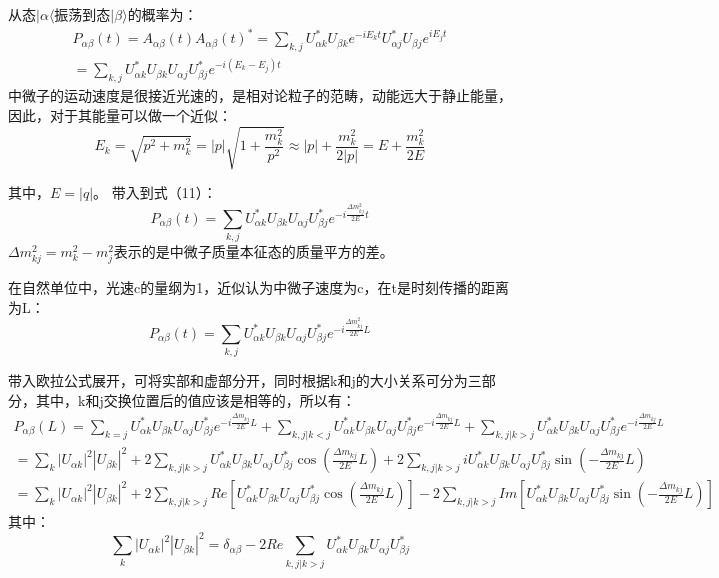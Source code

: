 \documentclass[10pt,a4paper]{article}
\begin{document}
从态$|\alpha\langle$振荡到态$|\beta\rangle$的概率为：
\begin{equation}
\begin{split}
P_{\alpha\beta}(t)=A_{\alpha\beta}(t){A_{\alpha\beta}(t)}^*=\sum_{k,j}U_{\alpha k}^{*}U_{\beta k}e^{-iE_{k}t}U_{\alpha j}^{*}U_{\beta j}e^{iE_{j}t}\\
=\sum_{k,j}U_{\alpha k}^{*}U_{\beta k}U_{\alpha j}U_{\beta j}^{*}e^{-i(E_{k}-E_{j})t}
\end{split}
\end{equation}
中微子的运动速度是很接近光速的，是相对论粒子的范畴，动能远大于静止能量，因此，对于其能量可以做一个近似：
\begin{equation}
E_{k}=\sqrt{p^2+m_k^2}=|p|\sqrt{1+\frac{m_k^2}{p^2}}\approx |p|+\frac{m_k^2}{2|p|}=E+\frac{m_k^2}{2E}
\end{equation}

其中，$E=|q|$。
带入到式（11）：
\begin{equation}
P_{\alpha\beta}(t)=\sum_{k,j}U_{\alpha k}^{*}U_{\beta k}U_{\alpha j}U_{\beta j}^{*}e^{-i\frac{\Delta m_{kj}^2}{2E}t}
\end{equation}
$\Delta m_{kj}^2=m_k^2-m_j^2$表示的是中微子质量本征态的质量平方的差。

在自然单位中，光速c的量纲为1，近似认为中微子速度为c，在t是时刻传播的距离为L：
\begin{equation}
P_{\alpha\beta}(t)=\sum_{k,j}U_{\alpha k}^{*}U_{\beta k}U_{\alpha j}U_{\beta j}^{*}e^{-i\frac{\Delta m_{kj}^2}{2E}L}
\end{equation}

带入欧拉公式展开，可将实部和虚部分开，同时根据k和j的大小关系可分为三部分，其中，k和j交换位置后的值应该是相等的，所以有：
\begin{equation}
\begin{split}
P_{\alpha\beta}(L)=\sum_{k=j}U_{\alpha k}^{*}U_{\beta k}U_{\alpha j}U_{\beta j}^{*}e^{-i\frac{\Delta m_{kj}}{2E}L}+\sum_{k,j |k<j}U_{\alpha k}^{*}U_{\beta k}U_{\alpha j}U_{\beta j}^{*}e^{-i\frac{\Delta m_{kj}}{2E}L}+\sum_{k,j |k>j}U_{\alpha k}^{*}U_{\beta k}U_{\alpha j}U_{\beta j}^{*}e^{-i\frac{\Delta m_{kj}}{2E}L}\\
=\sum_{k}{|U_{\alpha k}|}^{2}{|U_{\beta k}|}^{2}+2\sum_{k,j |k>j}U_{\alpha k}^{*}U_{\beta k}U_{\alpha j}U_{\beta j}^{*}\cos(\frac{\Delta m_{kj}}{2E}L)+2\sum_{k,j |k>j}iU_{\alpha k}^{*}U_{\beta k}U_{\alpha j}U_{\beta j}^{*}\sin(-\frac{\Delta m_{kj}}{2E}L)\\
=\sum_{k}{|U_{\alpha k}|}^{2}{|U_{\beta k}|}^{2}+2\sum_{k,j |k>j}Re[U_{\alpha k}^{*}U_{\beta k}U_{\alpha j}U_{\beta j}^{*}\cos(\frac{\Delta m_{kj}}{2E}L)]-2\sum_{k,j |k>j}Im[U_{\alpha k}^{*}U_{\beta k}U_{\alpha j}U_{\beta j}^{*}\sin(-\frac{\Delta m_{kj}}{2E}L)]
\end{split}
\end{equation}
其中：\begin{equation}
\sum_{k}{|U_{\alpha k}|}^{2}{|U_{\beta k}|}^{2}=\delta_{\alpha\beta}-2Re\sum_{k,j |k>j}U_{\alpha k}^{*}U_{\beta k}U_{\alpha j}U_{\beta j}^{*}
\end{equation}
\end{document}
